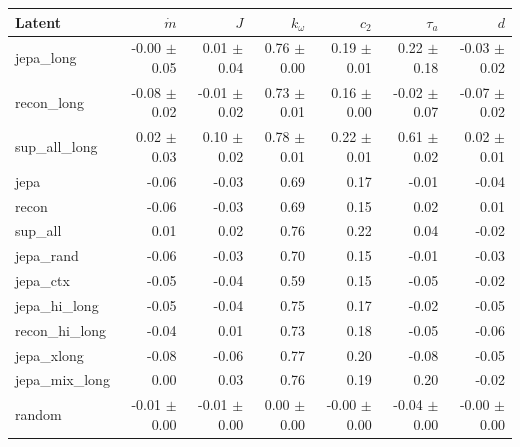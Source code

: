 \begin{tabular}{lrrrrrr}
\toprule
Latent & $\dot m$ & $J$ & $k_\omega$ & $c_2$ & $\tau_a$ & $d$\\
\midrule
jepa\_long & -0.00 $\pm$ 0.05 & 0.01 $\pm$ 0.04 & 0.76 $\pm$ 0.00 & 0.19 $\pm$ 0.01 & 0.22 $\pm$ 0.18 & -0.03 $\pm$ 0.02\\
recon\_long & -0.08 $\pm$ 0.02 & -0.01 $\pm$ 0.02 & 0.73 $\pm$ 0.01 & 0.16 $\pm$ 0.00 & -0.02 $\pm$ 0.07 & -0.07 $\pm$ 0.02\\
sup\_all\_long & 0.02 $\pm$ 0.03 & 0.10 $\pm$ 0.02 & 0.78 $\pm$ 0.01 & 0.22 $\pm$ 0.01 & 0.61 $\pm$ 0.02 & 0.02 $\pm$ 0.01\\
jepa & -0.06 & -0.03 & 0.69 & 0.17 & -0.01 & -0.04\\
recon & -0.06 & -0.03 & 0.69 & 0.15 & 0.02 & 0.01\\
sup\_all & 0.01 & 0.02 & 0.76 & 0.22 & 0.04 & -0.02\\
jepa\_rand & -0.06 & -0.03 & 0.70 & 0.15 & -0.01 & -0.03\\
jepa\_ctx & -0.05 & -0.04 & 0.59 & 0.15 & -0.05 & -0.02\\
jepa\_hi\_long & -0.05 & -0.04 & 0.75 & 0.17 & -0.02 & -0.05\\
recon\_hi\_long & -0.04 & 0.01 & 0.73 & 0.18 & -0.05 & -0.06\\
jepa\_xlong & -0.08 & -0.06 & 0.77 & 0.20 & -0.08 & -0.05\\
jepa\_mix\_long & 0.00 & 0.03 & 0.76 & 0.19 & 0.20 & -0.02\\
random & -0.01 $\pm$ 0.00 & -0.01 $\pm$ 0.00 & 0.00 $\pm$ 0.00 & -0.00 $\pm$ 0.00 & -0.04 $\pm$ 0.00 & -0.00 $\pm$ 0.00\\
\bottomrule
\end{tabular}